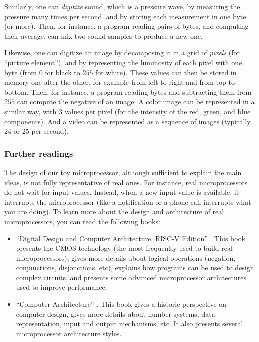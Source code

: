 Similarly, one can {\em digitize} sound, which is a pressure wave, by measuring
the pressure many times per second, and by storing each measurement in one byte
(or more). Then, for instance, a program reading pairs of bytes, and computing
their average, can mix two sound samples to produce a new one.

Likewise, one can digitize an image by decomposing it in a grid of {\em pixels}
(for ``picture element''), and by representing the luminosity of each pixel
with one byte (from $0$ for black to $255$ for white). These values can then be
stored in memory one after the other, for example from left to right and from
top to bottom. Then, for instance, a program reading bytes and subtracting them
from $255$ can compute the negative of an image. A color image can be
represented in a similar way, with 3 values per pixel (for the intensity of the
red, green, and blue components). And a video can be represented as a sequence
of images (typically 24 or 25 per second).

\subsubsection{Further readings}

The design of our toy microprocessor, although sufficient to explain the main
ideas, is not fully representative of real ones. For instance, real
microprocessors do not wait for input values. Instead, when a new input value
is available, it interrupts the microprocessor (like a notification or a phone
call interrupts what you are doing). To learn more about the design and
architecture of real microprocessors, you can read the following books:
\begin{itemize}
  \item ``Digital Design and Computer Architecture, RISC-V Edition''
  \cite{DigitalDesignAndComputerArchitecture}. This book presents the CMOS
  technology (the most frequently used to build real microprocessors), gives
  more details about logical operations (negation, conjunctions, disjonctions,
  etc), explains how programs can be used to design complex circuits, and
  presents some advanced microprocessor architectures used to improve
  performance.

  \item ``Computer Architecture'' \cite{ComputerArchitecture}. This book gives
  a historic perspective on computer design, gives more details about number
  systems, data representation, input and output mechanisms, etc. It also
  presents several microprocessor architecture styles.
\end{itemize}
